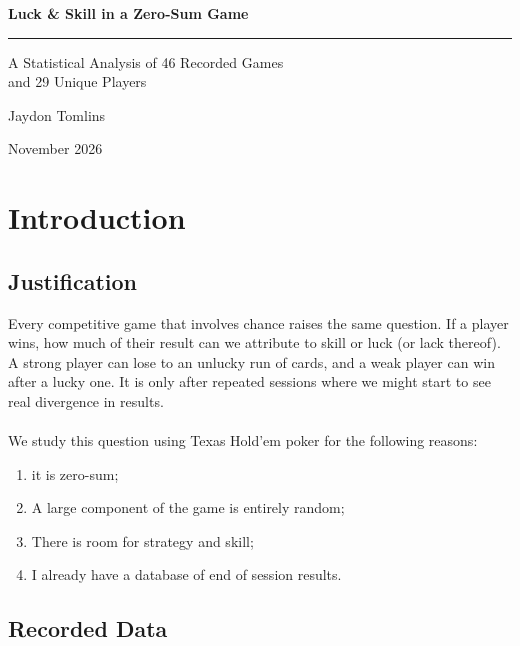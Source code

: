 \documentclass[11pt,a4paper]{article}
\title{\reporttitle}
\author{\reportauthor}
\date{\reportdate}
\newcommand{\reporttitle}{Luck \& Skill in a Zero-Sum Game}
\newcommand{\reportsubtitle}{A Statistical Analysis of 46 Recorded Games\\and 29 Unique Players}
\newcommand{\reportauthor}{Jaydon Tomlins}
\newcommand{\reportdate}{November 2026}
\begin{document}
\begin{titlepage}
  \centering
  \vspace*{\fill}

  {\Huge\bfseries \reporttitle \par}
  \vspace{0.6cm}
  \rule{0.6\textwidth}{0.6pt}\par
  \vspace{0.6cm}
  {\Large \reportsubtitle \par}

  \vspace{2.5cm}
  {\large \reportauthor \par}
  \vspace{0.2cm}
  {\large \reportdate \par}

  \vspace*{\fill}
\end{titlepage}

\clearpage{}
\tableofcontents
\newpage

\section{Introduction}

\subsection{Justification}

Every competitive game that involves chance raises the same question. If a player wins, how much of their result can we attribute to skill or luck (or lack thereof). A strong player can lose to an unlucky run of cards, and a weak player
can win after a lucky one. It is only after repeated sessions where we might start to see real divergence in results.
\\\\
We study this question using Texas Hold'em poker for the following reasons:
\begin{enumerate}
  \item it is zero-sum;
  \item A large component of the game is entirely random;
  \item There is room for strategy and skill;
  \item I already have a database of end of session results.
\end{enumerate}

\subsection{Recorded Data}
\end{document}
